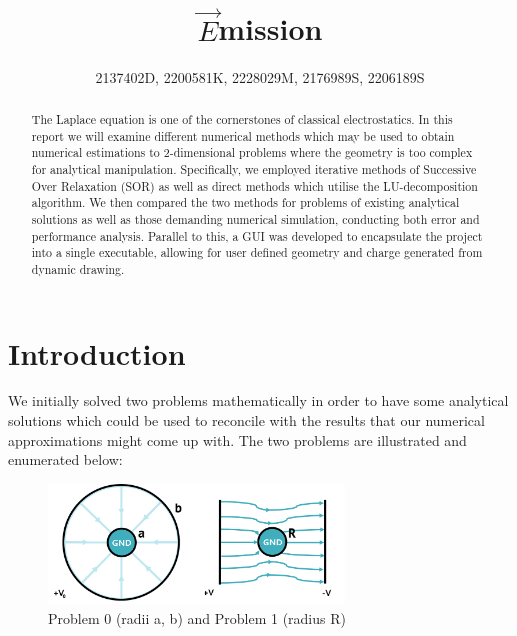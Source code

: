 \documentclass[a4paper]{article}
\title{$\vec{E}$mission}
\author{2137402D, 2200581K, 2228029M, 2176989S, 2206189S}
\begin{document}
\maketitle

\begin{abstract}
The Laplace equation is one of the cornerstones of classical electrostatics. 
In this report we will examine different numerical methods which may be used to 
obtain numerical estimations to 2-dimensional problems where the geometry is 
too complex for analytical manipulation. Specifically, we employed iterative 
methods of Successive Over Relaxation (SOR) as well as direct methods which 
utilise the LU-decomposition algorithm. We then compared the two methods for 
problems of existing analytical solutions as well as those demanding numerical 
simulation, conducting both error and performance analysis. Parallel to this, a 
GUI was developed to encapsulate the project into a single executable, allowing 
for user defined geometry and charge generated from dynamic drawing.
\end{abstract}

\section{Introduction}
We initially solved two problems mathematically in order to have some 
analytical solutions which could be used to reconcile with the results that our 
numerical approximations might come up with. The two problems are illustrated 
and enumerated below:
\begin{figure}[h]
\centering
\includegraphics[width=0.7\textwidth]{AnalProblems.png}
\caption{\label{fig:frog}Problem 0 (radii a, b) and Problem 1 (radius R)}
\end{figure}
\end{document}
